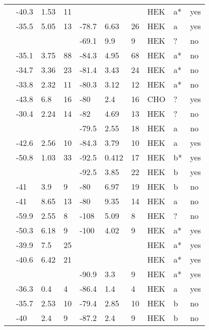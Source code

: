 \begin{longtable}{p{6cm}|lll|lll|lll}
\citet{Detta2014MutationDB} & -40.3 & 1.53 & 11 & && & HEK & a* & yes \\
\citet{Ge2008MutationDB} & -35.5 & 5.05 & 13 & -78.7 & 6.63 & 26 & HEK & a & yes \\
\citet{Glaaser2012MutationDB} & && & -69.1 & 9.9 & 9 & HEK & ? & no \\
\citet{Guetter2013MutationDB} & -35.1 & 3.75 & 88 & -84.3 & 4.95 & 68 & HEK & a* & no \\
\citet{Gui2010aMutationDB} & -34.7 & 3.36 & 23 & -81.4 & 3.43 & 24 & HEK & a* & no \\
\citet{Gui2010bMutationDB} & -33.8 & 2.32 & 11 & -80.3 & 3.12 & 12 & HEK & a* & no \\
\citet{Hayashi2015MutationDB} & -43.8 & 6.8 & 16 & -80 & 2.4 & 16 & CHO & ? & yes \\
\citet{Holst2009MutationDB} & -30.4 & 2.24 & 14 & -82 & 4.69 & 13 & HEK & ? & no \\
\citet{Hoshi2014MutationDB} & && & -79.5 & 2.55 & 18 & HEK & a & no \\
\citet{Hsueh2009MutationDB} & -42.6 & 2.56 & 10 & -84.3 & 3.79 & 10 & HEK & a & yes \\
\citet{Hu2007MutationDB} & -50.8 & 1.03 & 33 & -92.5 & 0.412 & 17 & HEK & b* & yes \\
\citet{Hu2014MutationDB} & && & -92.5 & 3.85 & 22 & HEK & b & yes \\
\citet{Hu2015MutationDB} & -41 & 3.9 & 9 & -80 & 6.97 & 19 & HEK & b & no \\
\citet{Hu2015MutationDB} & -41 & 8.65 & 13 & -80 & 9.35 & 14 & HEK & a & no \\
\citet{Huang2006MutationDB} & -59.9 & 2.55 & 8 & -108 & 5.09 & 8 & HEK & ? & no \\
\citet{Huang2009MutationDB} & -50.3 & 6.18 & 9 & -100 & 4.02 & 9 & HEK & a* & yes \\
\citet{Itoh2005aMutationDB} & -39.9 & 7.5 & 25 & && & HEK & a* & yes \\
\citet{Itoh2005bMutationDB} & -40.6 & 6.42 & 21 & && & HEK & a* & yes \\
\citet{Itoh2007MutationDB} & && & -90.9 & 3.3 & 9 & HEK & a* & yes \\
\citet{Juang2014aMutationDB} & -36.3 & 0.4 & 4 & -86.4 & 1.4 & 4 & HEK & a & yes \\
\citet{Kapplinger2015MutationDB} & -35.7 & 2.53 & 10 & -79.4 & 2.85 & 10 & HEK & b & no \\
\citet{Kapplinger2015MutationDB} & -40 & 2.4 & 9 & -87.2 & 2.4 & 9 & HEK & b & no \\

\end{longtable}
